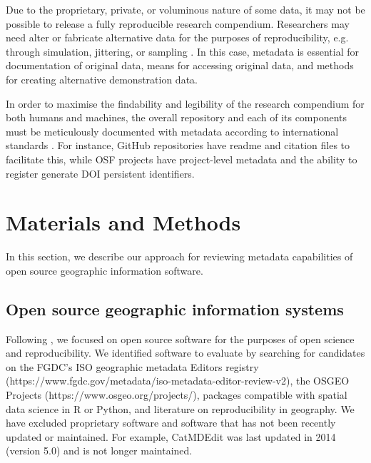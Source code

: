 \documentclass{isprs} %
\begin{document}
Due to the proprietary, private, or voluminous nature of some data, it may not be possible to release a fully reproducible research compendium.
Researchers may need alter or fabricate alternative data for the purposes of reproducibility, e.g. through simulation, jittering, or sampling \citet{Tullis2021,Singleton2016}. 
In this case, metadata is essential for documentation of original data, means for accessing original data, and methods for creating alternative demonstration data.

In order to maximise the findability and legibility of the research compendium for both humans and machines, the overall repository and each of its components must be meticulously documented with metadata according to international standards \citep{Wilkinson2016,Wilson2021}.
For instance, GitHub repositories have readme and citation files to facilitate this, while OSF projects have project-level metadata and the ability to register generate DOI persistent identifiers.

\section{Materials and Methods}\label{methods}

In this section, we describe our approach for reviewing metadata capabilities of open source geographic information software.

\subsection{Open source geographic information systems}\label{software}

Following \citet{Singleton2016}, we focused on open source software for the purposes of open science and reproducibility.
We identified software to evaluate by searching for candidates on the FGDC's ISO geographic metadata Editors registry (https://www.fgdc.gov/metadata/iso-metadata-editor-review-v2), the OSGEO Projects (https://www.osgeo.org/projects/), packages compatible with spatial data science in R or Python, and literature on reproducibility in geography.
We have excluded proprietary software and software that has not been recently updated or maintained. For example, CatMDEdit was last updated in 2014 (version 5.0) and is not longer maintained. 
\end{document}
